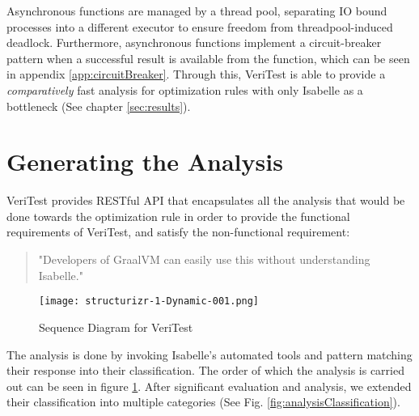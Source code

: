 Asynchronous functions are managed by a thread pool, separating IO bound processes into a different executor to ensure freedom from 
threadpool-induced deadlock. Furthermore, asynchronous functions implement a circuit-breaker pattern when a successful result is available 
from the function, which can be seen in appendix \ref{app:circuitBreaker}. Through this, VeriTest is able to provide a \emph{comparatively} 
fast analysis for optimization rules with only Isabelle as a bottleneck (See chapter \ref{sec:results}).

\section{Generating the Analysis}
\label{sec:generateAnalysis}

VeriTest provides RESTful API that encapsulates all the analysis that would be done towards the optimization rule 
in order to provide the functional requirements of VeriTest, and satisfy the non-functional requirement:

\begin{quote}
    "Developers of GraalVM can easily use this without understanding Isabelle."
\end{quote}

\begin{figure}[!htb]
    \centering
    \texttt{[image: structurizr-1-Dynamic-001.png]}
    \caption{Sequence Diagram for VeriTest}
    \label{fig:sequenceDiagram}
\end{figure}

The analysis is done by invoking Isabelle's automated tools and pattern matching their response into their classification. 
The order of which the analysis is carried out can be seen in figure \ref{fig:sequenceDiagram}. After significant 
evaluation and analysis, we extended their classification into multiple categories (See Fig. \ref{fig:analysisClassification}).

